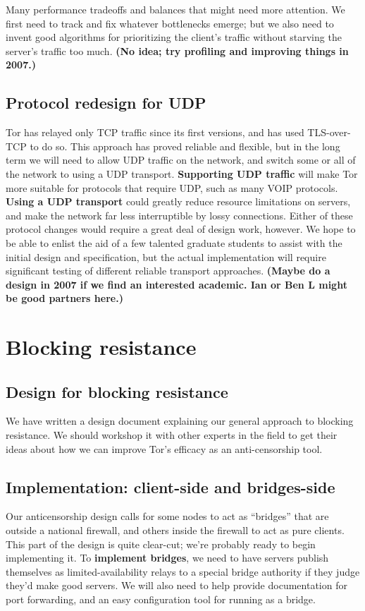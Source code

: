 \documentclass{article}
\newcommand{\plan}[1]{ {\bf (#1)}}
\begin{document}
Many performance tradeoffs and balances that might need more attention.
We first need to track and fix whatever bottlenecks emerge; but we also
need to invent good algorithms for prioritizing the client's traffic
without starving the server's traffic too much.\plan{No idea; try
profiling and improving things in 2007.}

\subsection{Protocol redesign for UDP}
Tor has relayed only TCP traffic since its first versions, and has used
TLS-over-TCP to do so.  This approach has proved reliable and flexible, but
in the long term we will need to allow UDP traffic on the network, and switch
some or all of the network to using a UDP transport.  {\bf Supporting UDP
  traffic} will make Tor more suitable for protocols that require UDP, such
as many VOIP protocols.  {\bf Using a UDP transport} could greatly reduce
resource limitations on servers, and make the network far less interruptible
by lossy connections.  Either of these protocol changes would require a great
deal of design work, however.  We hope to be able to enlist the aid of a few
talented graduate students to assist with the initial design and
specification, but the actual implementation will require significant testing
of different reliable transport approaches.\plan{Maybe do a design in 2007 if
we find an interested academic.  Ian or Ben L might be good partners here.}

\section{Blocking resistance}

\subsection{Design for blocking resistance}
We have written a design document explaining our general approach to blocking
resistance.  We should workshop it with other experts in the field to get
their ideas about how we can improve Tor's efficacy as an anti-censorship
tool.

\subsection{Implementation: client-side and bridges-side}

Our anticensorship design calls for some nodes to act as ``bridges''
that are outside a national firewall, and others inside the firewall to
act as pure clients.  This part of the design is quite clear-cut; we're
probably ready to begin implementing it.  To {\bf implement bridges}, we
need to have servers publish themselves as limited-availability relays
to a special bridge authority if they judge they'd make good servers.
We will also need to help provide documentation for port forwarding,
and an easy configuration tool for running as a bridge.
\end{document}
